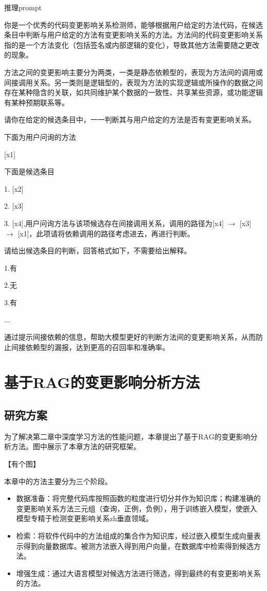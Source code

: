 \begin{promptbox}{推理prompt}

你是一个优秀的代码变更影响关系检测师，能够根据用户给定的方法代码，在候选条目中判断与用户给定的方法有变更影响关系的方法。方法间的代码变更影响关系指的是一个方法变化（包括签名或内部逻辑的变化），导致其他方法需要随之更改的现象。

方法之间的变更影响主要分为两类，一类是静态依赖型的，表现为方法间的调用或间接调用关系。另一类则是逻辑型的，表现为方法的实现逻辑或所操作的数据之间存在某种隐含的关联，如共同维护某个数据的一致性、共享某些资源，或功能逻辑有某种预期联系等。

请你在给定的候选条目中，一一判断其与用户给定的方法是否有变更影响关系。

下面为用户问询的方法

[x1]

下面是候选条目

1. [x2]

2. [x3]

3. [x4],用户问询方法与该项候选存在间接调用关系，调用的路径为[x4] $\rightarrow$ [x3] $\rightarrow$ [x1]，此项请将依赖调用的路径考虑进去，再进行判断。


请给出候选条目的判断，回答格式如下，不需要给出解释。

1.有 

2.无 

3.有

    ...
    
\end{promptbox}

通过提示间接依赖的信息，帮助大模型更好的判断方法间的变更影响关系，从而防止间接依赖型的漏报，达到更高的召回率和准确率。


\section{基于RAG的变更影响分析方法}

\subsection{研究方案}

为了解决第二章中深度学习方法的性能问题，本章提出了基于RAG的变更影响分析方法。图中展示了本章方法的研究框架。

【有个图】


本章中的方法主要分为三个阶段。

\begin{itemize}

    \item 数据准备：将完整代码库按照函数的粒度进行切分并作为知识库；构建准确的变更影响关系方法三元组（查询，正例，负例），用于训练嵌入模型，使嵌入模型专精于检测变更影响关系zh垂直领域。

    \item 检索：将软件代码中的方法组成的集合作为知识库，经过嵌入模型生成向量表示得到向量数据库。被测方法嵌入得到用户向量，在数据库中检索得到候选方法。
    
    \item 增强生成：通过大语言模型对候选方法进行筛选，得到最终的有变更影响关系的方法。
    
\end{itemize}


